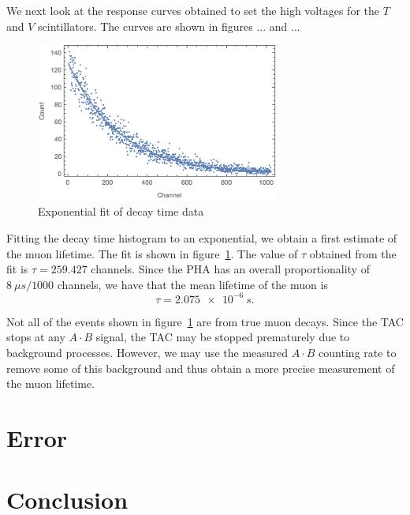 \documentclass[aps, reprint,amsmath,amssymb]{revtex4-1} %
\begin{document}
We next look at the response curves obtained to set the high voltages for the $T$ and $V$ scintillators. The curves are shown in figures ... and ...



\begin{figure}
\centering
\includegraphics[width=8cm]{fit.png}
\caption{Exponential fit of decay time data}
\label{fig:fit}
\end{figure}

Fitting the decay time histogram to an exponential, we obtain a first estimate of the muon lifetime. The fit is shown in figure~\ref{fig:fit}. The value of $\tau$ obtained from the fit is $\tau = 259.427$ channels. Since the PHA has an overall proportionality of $\SI{8}{\mu s}/1000$ channels, we have that the mean lifetime of the muon is 
\[
	\tau = \SI{2.075e-6}{s}.
\]

Not all of the events shown in figure~\ref{fig:fit} are from true muon decays. Since the TAC stops at any $A \cdot B$ signal, the TAC may be stopped prematurely due to background processes. However, we may use the measured $A \cdot B$ counting rate to remove some of this background and thus obtain a more precise measurement of the muon lifetime. 


\section{Error}



\section{Conclusion}
\end{document}
